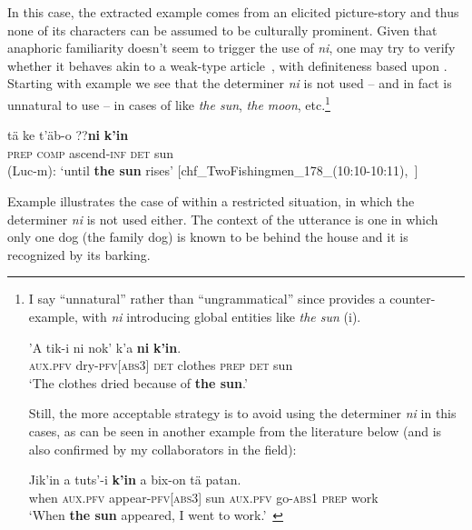 \documentclass[output=paper
,modfonts
,nonflat]{langsci/langscibook}
\begin{document}
In this case, the extracted example comes from an elicited picture-story and thus none of its characters can be assumed to be culturally prominent. 
Given that anaphoric familiarity doesn't seem to trigger the use of \textit{ni}, one may try to verify whether it behaves akin to a weak-type article~\citep{Schwarz2013}, with definiteness based upon . Starting with example  we see that the determiner \textit{ni} is not used -- and in fact is unnatural to use -- in  cases of  like \textit{the sun}, \textit{the moon}, etc.\footnote{I say ``unnatural'' rather than ``ungrammatical'' since \citet{Knowles1984} provides a counter-example, with \textit{ni} introducing global entities like \textit{the sun} (i). 
	
	\ea \label{ex:pico:n5i} 
		\gll 'A tik-i ni nok' k'a \textbf{ni} \textbf{k'in}.\\
		\textsc{aux.pfv} {dry-\textsc{pfv[abs3]}} \textsc{det} {clothes} \textsc{prep} \textsc{det} {sun}\\
		\glt `The clothes dried because of \textbf{the sun}.'~\citep[309]{Knowles1984}
	\z
		
	Still, the more acceptable strategy is to avoid using the determiner \textit{ni} in this cases, as can be seen in another example from the literature below (and is also confirmed by my collaborators in the field):
	
	\ea\label{ex:pico:n5ii}
		\gll Jik'in a tuts'-i \textbf{k'in} a bix-on tä patan.\\
		{when} \textsc{aux.pfv} {appear-\textsc{pfv[abs3]}} {\footnotesize sun} \textsc{aux.pfv} {go-\textsc{abs1}} \textsc{prep} {work}\\
		\glt `When \textbf{the sun} appeared, I went to work.'~\citep[113]{SchumannGalvez2012}
	\z}


\ea \label{ex:pico:7}
\gll t\"a ke t'\"ab-o {\op}\textnormal{??}\textbf{ni}{\cp} \textbf{k'in} \\
\textsc{prep} \textsc{comp} ascend-\textsc{inf} \textsc{det} {sun} \\
\glt (Luc-m): `until \textbf{the sun} rises' [chf\_TwoFishingmen\_178\_(10:10-10:11),~\citealt{Delgado-Galvan2018archive}]
\z

Example  illustrates the case of  within a restricted situation, in which the determiner \textit{ni} is not used either. The context of the utterance is one in which only one dog (the family dog) is known to be behind the house and it is recognized by its barking. 
\end{document}
